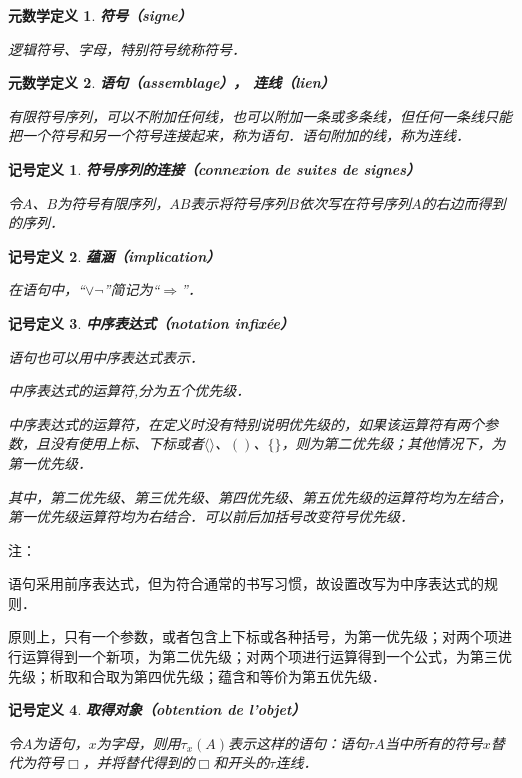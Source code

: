 \documentclass[12pt, a4paper, oneside]{book}
\newtheorem{metadef}{元数学定义}
\newtheorem{sign}{记号定义}
\begin{document}
			\begin{metadef}
				\textbf{符号（signe）}
				\par
				逻辑符号、字母，特别符号统称符号．
			\end{metadef}		

			\begin{metadef}
				\textbf{语句（assemblage）， 连线（lien）}
				\par
				有限符号序列，可以不附加任何线，也可以附加一条或多条线，但任何一条线只能把一个符号和另一个符号连接起来，称为语句．语句附加的线，称为连线．
			\end{metadef}

			\begin{sign}
				\textbf{符号序列的连接（connexion de suites de signes）}
				\par
				令$A$、$B$为符号有限序列，$AB$表示将符号序列$B$依次写在符号序列$A$的右边而得到的序列．
			\end{sign}
			
			\begin{sign}
				\textbf{蕴涵（implication）}
				\par
				在语句中，“$\lor\neg$”简记为“$\Rightarrow$”．
			\end{sign}		

			\begin{sign}
				\textbf{中序表达式（notation infixée）}
				\par
				语句也可以用中序表达式表示．
				\par
				中序表达式的运算符,分为五个优先级．
				\par
				中序表达式的运算符，在定义时没有特别说明优先级的，如果该运算符有两个参数，且没有使用上标、下标或者$\langle\rangle$、$()$、$\{\}$，则为第二优先级；其他情况下，为第一优先级．
				\par
				其中，第二优先级、第三优先级、第四优先级、第五优先级的运算符均为左结合，第一优先级运算符均为右结合．可以前后加括号改变符号优先级．
			\end{sign}
			注：
			\par
			语句采用前序表达式，但为符合通常的书写习惯，故设置改写为中序表达式的规则．
			\par
			原则上，只有一个参数，或者包含上下标或各种括号，为第一优先级；对两个项进行运算得到一个新项，为第二优先级；对两个项进行运算得到一个公式，为第三优先级；析取和合取为第四优先级；蕴含和等价为第五优先级．

			\begin{sign}
				\textbf{取得对象（obtention de l'objet）}
				\par
				令$A$为语句，$x$为字母，则用$\tau_x(A)$表示这样的语句：语句$\tau A$当中所有的符号$x$替代为符号$\Box$，并将替代得到的$\Box$和开头的$\tau$连线．
			\end{sign}
			
\end{document}
